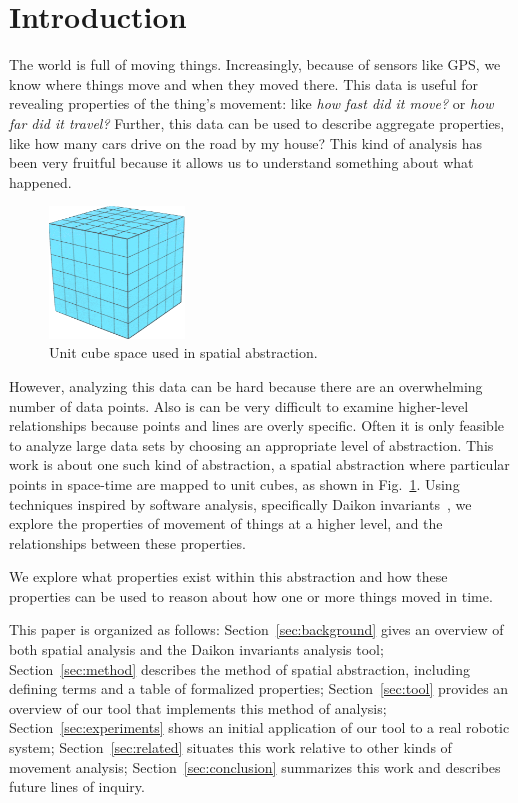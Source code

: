 \section{Introduction}

The world is full of moving things.
Increasingly, because of sensors like GPS, we know where things move and when they moved there.  
This data is useful for revealing properties of the thing's movement: like \emph{how fast did it move?} or \emph{how far did it travel?}
Further, this data can be used to describe aggregate properties, like how many cars drive on the road by my house?
This kind of analysis has been very fruitful because it allows us to understand something about what happened.

\begin{figure}
  \centering
  \includegraphics[width=0.32\textwidth]{./figures/unitCube}
  \caption{Unit cube space used in spatial abstraction.}
  \label{fig:unitCubes}
\end{figure}

However, analyzing this data can be hard because there are an overwhelming number of data points.
Also is can be very difficult to examine higher-level relationships because points and lines are overly specific.  
Often it is only feasible to analyze large data sets by choosing an appropriate level of abstraction.
This work is about one such kind of abstraction, a spatial abstraction where particular points in space-time are mapped to unit cubes, as shown in Fig.~\ref{fig:unitCubes}.
Using techniques inspired by software analysis, specifically Daikon invariants~\cite{kataoka2001automated}, we explore the properties of movement of things at a higher level, and the relationships between these properties.

We explore what properties exist within this abstraction and how these properties can be used to reason about how one or more things moved in time.

This paper is organized as follows:
Section~\ref{sec:background} gives an overview of both spatial analysis and the Daikon invariants analysis tool;
Section~\ref{sec:method} describes the method of spatial abstraction, including defining terms and a table of formalized properties;
Section~\ref{sec:tool} provides an overview of our tool that implements this method of analysis;
Section~\ref{sec:experiments} shows an initial application of our tool to a real robotic system;
Section~\ref{sec:related} situates this work relative to other kinds of movement analysis;
Section~\ref{sec:conclusion} summarizes this work and describes future lines of inquiry. 




